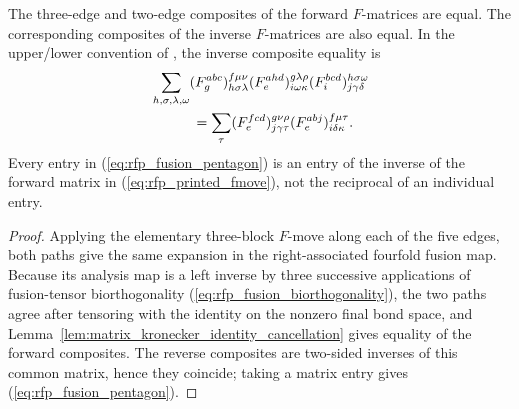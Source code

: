 \begin{lemma}%
    \label{thm:mpdo_complete_zipper_fusion_pentagon}
    \leanok
    The three-edge and two-edge composites of the forward
    $F$-matrices are equal. The corresponding composites of the inverse
    $F$-matrices are also equal. In the upper/lower convention of
    \cite[equation~(33)]{Bultinck2017Anyons}, the inverse composite equality is
    \begin{align}
         & \sum_{h,\sigma,\lambda,\omega}
        (F^{abc}_{g})^{f\mu\nu}_{h\sigma\lambda}
        (F^{ahd}_{e})^{g\lambda\rho}_{i\omega\kappa}
        (F^{bcd}_{i})^{h\sigma\omega}_{j\gamma\delta} \notag \\
         & \hspace{3em}=
        \sum_{\tau}
        (F^{fcd}_{e})^{g\nu\rho}_{j\gamma\tau}
        (F^{abj}_{e})^{f\mu\tau}_{i\delta\kappa}.
        \label{eq:rfp_fusion_pentagon}
    \end{align}
    Every entry in (\ref{eq:rfp_fusion_pentagon}) is an entry of the inverse
    of the forward matrix in (\ref{eq:rfp_printed_fmove}), not the reciprocal
    of an individual entry.
\end{lemma}
\begin{proof}\leanok
    Applying the elementary three-block $F$-move along each of the five edges,
    both paths give the same expansion in the right-associated fourfold
    fusion map. Because its analysis map is a left inverse by three successive
    applications of fusion-tensor biorthogonality
    (\ref{eq:rfp_fusion_biorthogonality}), the two paths agree after
    tensoring with the identity on the nonzero final bond space, and
    Lemma~\ref{lem:matrix_kronecker_identity_cancellation} gives equality of
    the forward composites. The reverse composites are two-sided inverses of
    this common matrix, hence they coincide; taking a matrix entry gives
    (\ref{eq:rfp_fusion_pentagon}).
\end{proof}

